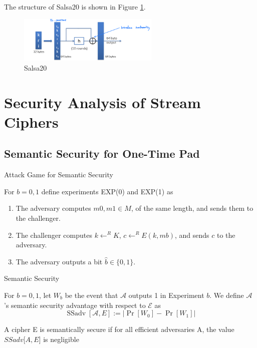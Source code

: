 The structure of Salsa20 is shown in Figure \ref{fig: 02 Salsa20}.

\begin{figure}
    \centering
    \includegraphics[width=0.6\textwidth]{Stanford_Crypto_1/fig/02_Stream_Cipher/Salsa20.png}
    \caption{Salsa20}
    \label{fig: 02 Salsa20}
\end{figure}

\section{Security Analysis of Stream Ciphers}

\subsection{Semantic Security for One-Time Pad}

\begin{method}  Attack Game for Semantic Security

    For   $b=0,1$   define experiments EXP(0) and EXP(1) as

    \begin{enumerate} [itemsep=2pt,topsep=0pt,parsep=0pt]
        \item The adversary computes $m0, m1 \in M$, of the same length, and sends them to the challenger.
        \item The challenger computes $k \leftarrow^R K$, $c \leftarrow^R E(k, mb)$, and sends $c$ to the adversary.
        \item The adversary outputs a bit $\hat{b} \in \{0, 1\}$.
    \end{enumerate}


\end{method}



\begin{definition}  Semantic Security

    For $b=0,1$, let $W_{b}$ be the event that $\mathcal{A}$ outputs 1 in Experiment $b$. We define $\mathcal{A}$ 's semantic security advantage with respect to $\mathcal{E}$ as
    $$
    \operatorname{SSadv}[\mathcal{A}, E]:=\left|\operatorname{Pr}\left[W_{0}\right]-\operatorname{Pr}\left[W_{1}\right]\right|
    $$

    A cipher E is semantically secure if for all efficient adversaries A, the value $SSadv[A, E$] is negligible
    
\end{definition}


